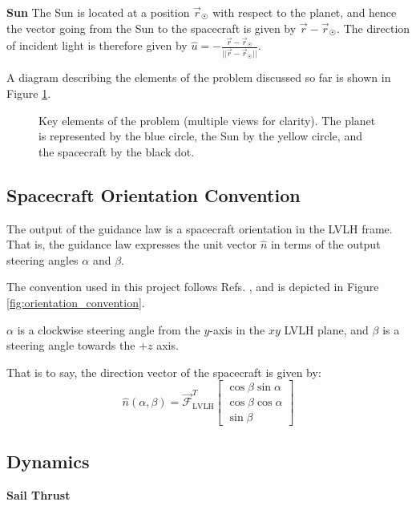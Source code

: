 \textbf{Sun}
The Sun is located at a position \(\vec{r}_{\astrosun}\) with respect to the planet, and hence the vector going from the Sun to the spacecraft is given by \(\vec{r} - \vec{r}_{\astrosun}\). The direction of incident light is therefore given by \(\hat{u} = -\frac{\vec{r} - \vec{r}_{\astrosun}}{||\vec{r} - \vec{r}_{\astrosun}||}\).

A diagram describing the elements of the problem discussed so far is shown in Figure \ref{fig:problem_setup}.
\begin{figure}[H]
  \centering
  
  
  \caption{Key elements of the problem (multiple views for clarity). The planet is represented by the blue circle, the Sun by the yellow circle, and the spacecraft by the black dot.}
  \label{fig:problem_setup}
\end{figure}


\subsection{Spacecraft Orientation Convention}
The output of the guidance law is a spacecraft orientation in the LVLH frame. That is, the guidance law expresses the unit vector \(\hat{n}\) in terms of the output steering angles \(\alpha\) and \(\beta\).

The convention used in this project follows Refs. \cite{petropoulos2004low, vargaperez2016, sanjeev2023}, and is depicted in Figure \ref{fig:orientation_convention}.


\(\alpha\) is a clockwise steering angle from the \(y\)-axis in the \(xy\) LVLH plane, and \(\beta\) is a steering angle towards the \(+z\) axis.

That is to say, the direction vector of the spacecraft is given by:
\begin{equation}
  \hat{n}(\alpha, \beta) = \mathcal{\vec{F}}_{\text{LVLH}}^T
  \begin{bmatrix}
    \cos \beta \sin \alpha \\
    \cos \beta \cos \alpha \\
    \sin \beta
  \end{bmatrix}
  \label{eq:alpha_beta_n}
\end{equation}


\subsection{Dynamics}
\textbf{Sail Thrust}

